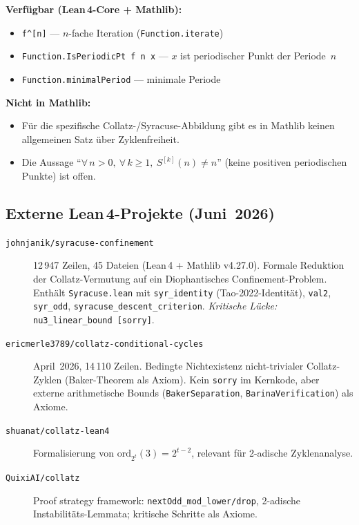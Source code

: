 \documentclass[12pt,a4paper]{article}
\newcommand{\Syr}{S}
\begin{document}
\begin{tcolorbox}[ergebnis]
\textbf{Verfügbar (Lean\,4-Core + Mathlib):}
\begin{itemize}
  \item \lstinline|f^[n]| --- $n$-fache Iteration (\lstinline|Function.iterate|)
  \item \lstinline|Function.IsPeriodicPt f n x| ---
    $x$ ist periodischer Punkt der Periode~$n$
  \item \lstinline|Function.minimalPeriod| --- minimale Periode
\end{itemize}
\end{tcolorbox}

\begin{tcolorbox}[lücke]
\textbf{Nicht in Mathlib:}
\begin{itemize}
  \item Für die spezifische Collatz-/Syracuse-Abbildung gibt es in Mathlib
    keinen allgemeinen Satz über Zyklenfreiheit.
  \item Die Aussage
    ``$\forall\, n > 0,\ \forall\, k \geq 1,\ \Syr^{[k]}(n) \neq n$''
    (keine positiven periodischen Punkte) ist offen.
\end{itemize}
\end{tcolorbox}

\subsection{Externe Lean\,4-Projekte (Juni~2026)}

\begin{description}
  \item[\texttt{johnjanik/syracuse-confinement}]
    12\,947 Zeilen, 45 Dateien (Lean\,4 + Mathlib v4.27.0).
    Formale Reduktion der Collatz-Vermutung auf ein Diophantisches
    Confinement-Problem. Enthält \texttt{Syracuse.lean} mit
    \lstinline|syr_identity| (Tao-2022-Identität), \lstinline|val2|,
    \lstinline|syr_odd|, \lstinline|syracuse_descent_criterion|.
    \emph{Kritische Lücke:} \lstinline|nu3_linear_bound [sorry]|.
  \item[\texttt{ericmerle3789/collatz-conditional-cycles}]
    April~2026, 14\,110 Zeilen. Bedingte Nichtexistenz nicht-trivialer
    Collatz-Zyklen (Baker-Theorem als Axiom).
    Kein \lstinline|sorry| im Kernkode, aber externe arithmetische Bounds
    (\texttt{BakerSeparation}, \texttt{BarinaVerification}) als Axiome.
  \item[\texttt{shuanat/collatz-lean4}]
    Formalisierung von $\mathrm{ord}_{2^t}(3) = 2^{t-2}$,
    relevant für 2-adische Zyklenanalyse.
  \item[\texttt{QuixiAI/collatz}]
    Proof strategy framework: \lstinline|nextOdd_mod_lower/drop|,
    2-adische Instabilitäts-Lemmata; kritische Schritte als Axiome.
\end{description}
\end{document}

